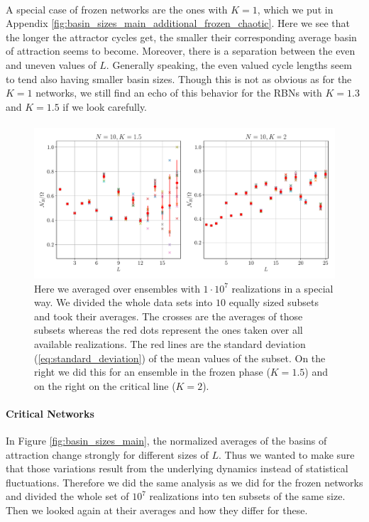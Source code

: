 \paragraph*{}
A special case of frozen networks are the ones with $K=1$, which we put in Appendix \ref{fig:basin_sizes_main_additional_frozen_chaotic}. Here we see that the longer the attractor cycles get, the smaller their corresponding average basin of attraction seems to become. Moreover, there is a separation between the even and uneven values of $L$. Generally speaking, the even valued cycle lengths seem to tend also having smaller basin sizes. Though this is not as obvious as for the $K=1$ networks, we still find an echo of this behavior for the RBNs with $K=1.3$ and $K=1.5$ if we look carefully.

\paragraph*{}
\begin{figure}[]
	\includegraphics[width=\textwidth]{Plots/new_scatter}
	\caption{Here we averaged over ensembles with $1\cdot 10^7$ realizations in a special way. We divided the whole data sets into $10$ equally sized subsets and took their averages. The crosses are the averages of those subsets whereas the red dots represent the ones taken over all available realizations. The red lines are the standard deviation (\ref{eq:standard_deviation}) of the mean values of the subset. On the right we did this for an ensemble in the frozen phase ($K=1.5$) and on the right on the critical line ($K=2$).}
	\label{fig:new_scatter}
\end{figure}


\paragraph*{Critical Networks}
In Figure \ref{fig:basin_sizes_main}, the normalized averages of the basins of attraction change strongly for different sizes of $L$. Thus we wanted to make sure that those variations result from the underlying dynamics instead of statistical fluctuations. Therefore we did the same analysis as we did for the frozen networks and divided the whole set of $10^7$ realizations into ten subsets of the same size. Then we looked again at their averages and how they differ for these.

